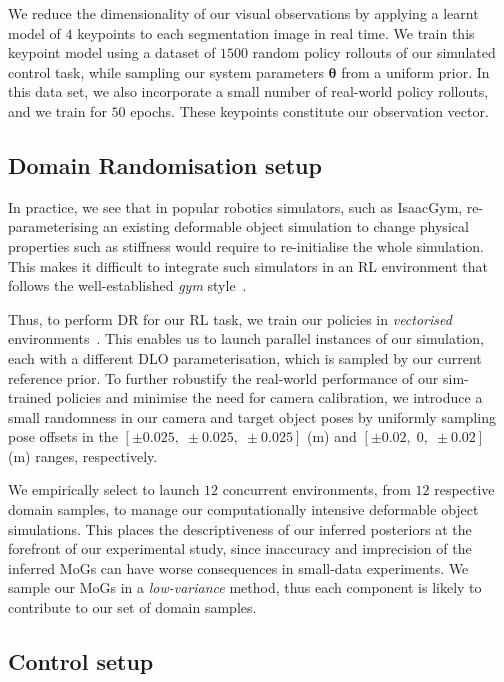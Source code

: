 We reduce the dimensionality of our visual observations by applying a learnt model of $4$ keypoints to each segmentation image in real time. We train this keypoint model using a dataset of $1500$ random policy rollouts of our simulated control task, while sampling our system parameters $\boldsymbol{\theta}$ from a uniform prior. In this data set, we also incorporate a small number of real-world policy rollouts, and we train for $50$ epochs. These keypoints constitute our observation vector.

\subsection{Domain Randomisation setup}
\label{subsec:dr-setup}

In practice, we see that in popular robotics simulators, such as IsaacGym, re-parameterising an existing deformable object simulation to change physical properties such as stiffness would require to re-initialise the whole simulation. This makes it difficult to integrate such simulators in an RL environment that follows the well-established \emph{gym} style~\cite{towers2024gymnasium}.

Thus, to perform DR for our RL task, we train our policies in \emph{vectorised} environments~\cite{stable-baselines3}. This enables us to launch parallel instances of our simulation, each with a different DLO parameterisation, which is sampled by our current reference prior. To further robustify the real-world performance of our sim-trained policies and minimise the need for camera calibration, we introduce a small randomness in our camera and target object poses by uniformly sampling pose offsets in the $[\pm0.025,\;\pm0.025,\;\pm0.025]$ (m) and $[\pm0.02,\;0,\;\pm0.02]$ (m) ranges, respectively.

We empirically select to launch $12$ concurrent environments, from $12$ respective domain samples, to manage our computationally intensive deformable object simulations. This places the descriptiveness of our inferred posteriors at the forefront of our experimental study, since inaccuracy and imprecision of the inferred MoGs can have worse consequences in small-data experiments. We sample our MoGs in a \emph{low-variance} method, thus each component is likely to contribute to our set of domain samples.

\subsection{Control setup}
\label{subsec:ctrl-setup}

